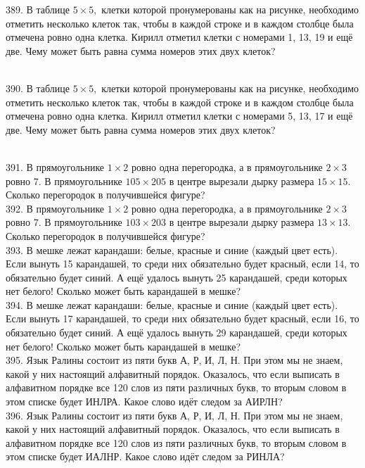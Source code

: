 389. В таблице $5\times5,$ клетки которой пронумерованы как на рисунке, необходимо отметить несколько клеток так, чтобы в каждой строке и в каждом столбце была отмечена ровно одна клетка. Кирилл отметил клетки с номерами 1, 13, 19 и ещё две. Чему может быть равна сумма номеров этих двух клеток?\\
\begin{figure}[ht!]
\end{figure}\\
390. В таблице $5\times5,$ клетки которой пронумерованы как на рисунке, необходимо отметить несколько клеток так, чтобы в каждой строке и в каждом столбце была отмечена ровно одна клетка. Кирилл отметил клетки с номерами 5, 13, 17 и ещё две. Чему может быть равна сумма номеров этих двух клеток?\\
\begin{figure}[ht!]
\end{figure}\\
391. В прямоугольнике $1\times2$ ровно одна перегородка, а в прямоугольнике $2\times3$ ровно 7. В прямоугольнике $105\times205$ в центре вырезали
дырку размера $15\times15.$ Сколько перегородок в получившейся фигуре?\\
392. В прямоугольнике $1\times2$ ровно одна перегородка, а в прямоугольнике $2\times3$ ровно 7. В прямоугольнике $103\times203$ в центре вырезали
дырку размера $13\times13.$ Сколько перегородок в получившейся фигуре?\\
393. В мешке лежат карандаши: белые, красные и синие (каждый цвет есть). Если вынуть 15 карандашей, то среди них обязательно будет красный, если 14, то обязательно будет синий. А ещё удалось вынуть 25 карандашей, среди которых нет белого! Сколько может быть карандашей в мешке?\\
394. В мешке лежат карандаши: белые, красные и синие (каждый цвет есть). Если вынуть 17 карандашей, то среди них обязательно будет красный, если 16, то обязательно будет синий. А ещё удалось вынуть 29 карандашей, среди которых нет белого! Сколько может быть карандашей в мешке?\\
395. Язык Ралины состоит из пяти букв А, Р, И, Л, Н. При этом мы не знаем, какой у них настоящий алфавитный порядок. Оказалось, что если выписать в алфавитном порядке все 120 слов из пяти различных букв, то вторым словом в этом списке будет ИНЛРА. Какое слово идёт следом за АИРЛН?\\
396. Язык Ралины состоит из пяти букв А, Р, И, Л, Н. При этом мы не знаем, какой у них настоящий алфавитный порядок. Оказалось, что если выписать в алфавитном порядке все 120 слов из пяти различных букв, то вторым словом в этом списке будет ИАЛНР. Какое слово идёт следом за РИНЛА?
